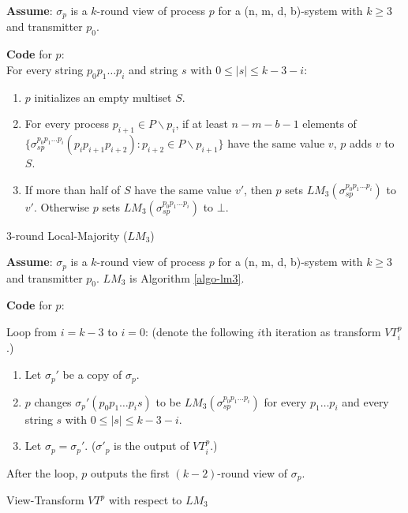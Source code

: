 \documentclass[11pt,conference,compsoc,onecolumn,romanappendices]{IEEEtran}
\newcommand{\tmstrong}[1]{\textbf{#1}}
\newenvironment{tmindent}{\begin{tmparmod}{1.0em}{1.0em}{0pt} }{\end{tmparmod}}
\newenvironment{tmparmod}[3]{\begin{list}{}{\setlength{\topsep}{0pt}\setlength{\leftmargin}{#1}\setlength{\rightmargin}{#2}\setlength{\parindent}{#3}\setlength{\listparindent}{\parindent}\setlength{\itemindent}{\parindent}\setlength{\parsep}{\parskip}} \item[]}{\end{list}}
\begin{document}
\begin{algorithm}[p]\label{algo-lm3}
  {\tmstrong{Assume}}: $\sigma_p$ is a $k$-round view of process $p$ for a
  (n, m, d, b)-system with $k \geqslant 3$ and transmitter $p_0$.{\hspace*{\fill}}

  {\tmstrong{Code}} for $p$:{\hspace*{\fill}}\\
  For every string $p_0 p_1 \ldots p_i$ and string $s$ with $0 \leqslant | s |
  \leqslant k - 3 - i$:
    \begin{tmindent}
      \begin{enumerate}
        \item $p$ initializes an empty multiset $S$.
        
        \item For every process $p_{i+1} \in P \backslash p_i$, if at least $n - m - b - 1$ elements of
        $\{ \sigma^{p_0 p_1 \ldots p_i}_{s p} (p_i p_{i+1} p_{i+2}): {p_{i+2} \in P \backslash p_{i+1}} \}$ have the same value $v$,
        $p$ adds $v$ to $S$.
        
        \item If more than half of $S$ have the same value $v'$, then $p$ sets
        $L M_3 (\sigma^{p_0 p_1 \ldots p_i}_{s p})$ to $v'$. Otherwise $p$
        sets $L M_3 (\sigma^{p_0 p_1 \ldots p_i}_{s p})$ to $\bot$.
      \end{enumerate}
    \end{tmindent}
  \caption{$3$-round Local-Majority ($L M_3$)}
\end{algorithm}

\begin{algorithm}[p]\label{algo-view}
  {\tmstrong{Assume}}: $\sigma_p$ is a $k$-round view of process $p$ for a
  (n, m, d, b)-system with $k \geqslant 3$ and  transmitter $p_0$.
  $L M_3$ is Algorithm \ref{algo-lm3}.{\hspace*{\fill}}
  
  {\tmstrong{Code}} for $p$:{\hspace*{\fill}}
  
  Loop from $i = k - 3$ to $i = 0$: (denote the following $i$th iteration as transform $V
  T_i^p$.)
  \begin{tmindent}
    \begin{enumerate}
      \item Let $\sigma_p'$ be a copy of $\sigma_p$.
      
      \item $p$ changes $\sigma_p' (p_0 p_1 \ldots p_i s)$ to be $L M_3
      (\sigma^{p_0 p_1 \ldots p_i}_{s p})$ for every $p_1 \ldots p_i$ and
      every string $s$ with $0 \leqslant | s | \leqslant k - 3 - i$.
      
      \item Let $\sigma_p = \sigma_p'$. ($\sigma'_p$ is the output of $V
      T_i^p$.)
    \end{enumerate}
  \end{tmindent}
  After the loop, $p$ outputs the first $(k - 2)$-round view of
  $\sigma_p$.

  \caption{View-Transform $V T^p$ with respect to $L M_3$}
\end{algorithm}
\end{document}
